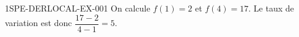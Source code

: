 \begin{corrige}{1SPE-DERLOCAL-EX-001}
On calcule $f(1)=2$ et $f(4)=17$. Le taux de variation est donc $\dfrac{17-2}{4-1}=5$.
\end{corrige}
